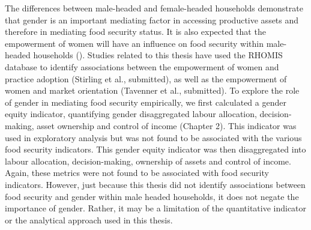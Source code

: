 The differences between male-headed and female-headed households demonstrate that gender is an important mediating factor in accessing productive assets and therefore in mediating food security status. It is also expected that the empowerment of women will have an influence on food security within male-headed households (\citealp{Dzanku2019, Price2018, AnderssonDjurfeldt2018a}). Studies related to this thesis have used the RHOMIS database to identify associations between the empowerment of women and practice adoption (Stirling et al., submitted), as well as the empowerment of women and market orientation (Tavenner et al., submitted). To explore the role of gender in mediating food security empirically, we first calculated a gender equity indicator, quantifying gender disaggregated labour allocation, decision-making, asset ownership and control of income (Chapter 2). This indicator was used in exploratory analysis but was not found to be associated with the various food security indicators. This gender equity indicator was then disaggregated into labour allocation, decision-making, ownership of assets and control of income. Again, these metrics were not found to be associated with food security indicators. However, just because this thesis did not identify associations between food security and gender within male headed households, it does not negate the importance of gender. Rather, it may be a limitation of the quantitative indicator or the analytical approach used in this thesis.

